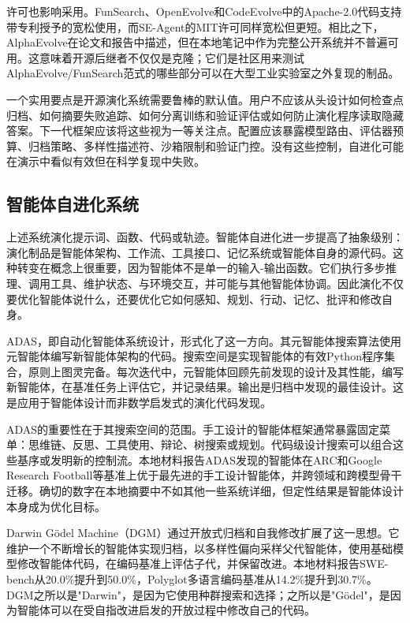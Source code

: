 许可也影响采用。FunSearch、OpenEvolve和CodeEvolve中的Apache-2.0代码支持带专利授予的宽松使用，而SE-Agent的MIT许可同样宽松但更短。相比之下，AlphaEvolve在论文和报告中描述，但在本地笔记中作为完整公开系统并不普遍可用。这意味着开源后继者不仅仅是克隆；它们是社区用来测试AlphaEvolve/FunSearch范式的哪些部分可以在大型工业实验室之外复现的制品。

一个实用要点是开源演化系统需要鲁棒的默认值。用户不应该从头设计如何检查点归档、如何摘要失败追踪、如何分离训练和验证评估或如何防止演化程序读取隐藏答案。下一代框架应该将这些视为一等关注点。配置应该暴露模型路由、评估器预算、归档策略、多样性描述符、沙箱限制和验证门控。没有这些控制，自进化可能在演示中看似有效但在科学复现中失败。

\subsection{智能体自进化系统}
\label{subsec:agent-self-evolution-systems}

上述系统演化提示词、函数、代码或轨迹。智能体自进化进一步提高了抽象级别：演化制品是智能体架构、工作流、工具接口、记忆系统或智能体自身的源代码。这种转变在概念上很重要，因为智能体不是单一的输入-输出函数。它们执行多步推理、调用工具、维护状态、与环境交互，并可能与其他智能体协调。因此演化不仅要优化智能体说什么，还要优化它如何感知、规划、行动、记忆、批评和修改自身。

ADAS，即自动化智能体系统设计，形式化了这一方向\cite{adas2025}。其元智能体搜索算法使用元智能体编写新智能体架构的代码。搜索空间是实现智能体的有效Python程序集合，原则上图灵完备。每次迭代中，元智能体回顾先前发现的设计及其性能，编写新智能体，在基准任务上评估它，并记录结果。输出是归档中发现的最佳设计。这是应用于智能体设计而非数学启发式的演化代码发现。

ADAS的重要性在于其搜索空间的范围。手工设计的智能体框架通常暴露固定菜单：思维链、反思、工具使用、辩论、树搜索或规划。代码级设计搜索可以组合这些基序或发明新的控制流。本地材料报告ADAS发现的智能体在ARC和Google Research Football等基准上优于最先进的手工设计智能体，并跨领域和跨模型骨干迁移。确切的数字在本地摘要中不如其他一些系统详细，但定性结果是智能体设计本身成为优化目标。

Darwin G{\"o}del Machine（DGM）通过开放式归档和自我修改扩展了这一思想\cite{darwingodelmachine2025}。它维护一个不断增长的智能体实现归档，以多样性偏向采样父代智能体，使用基础模型修改智能体代码，在编码基准上评估子代，并保留改进。本地材料报告SWE-bench从20.0\%提升到50.0\%，Polyglot多语言编码基准从14.2\%提升到30.7\%。DGM之所以是"Darwin"，是因为它使用种群搜索和选择；之所以是"G{\"o}del"，是因为智能体可以在受自指改进启发的开放过程中修改自己的代码。

